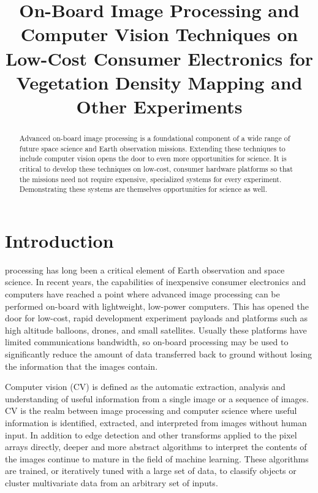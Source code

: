 \documentclass[conference]{IEEEtran} %
\title{On-Board Image Processing and Computer Vision Techniques on Low-Cost Consumer Electronics for Vegetation Density Mapping and Other Experiments}
\author{
   \IEEEauthorblockN{%
    Jeff~Maggio\IEEEauthorrefmark{1},
    Philip~Linden\IEEEauthorrefmark{2},
    T.J.~Tarazevits\IEEEauthorrefmark{3}
  }
  \IEEEauthorblockA{%
    RIT Space Exploration, Rochester Institute of Technology \\ %
    Rochester, N.Y. \\
    Email:
    \IEEEauthorrefmark{1}jxm9264.rit.edu,
    \IEEEauthorrefmark{2}pjl7651@rit.edu,
    \IEEEauthorrefmark{3}tjt3085@rit.edu
  }
}
\begin{document}
\maketitle%

\begin{abstract}
    Advanced on-board image processing is a foundational component of a wide range of future space science and Earth observation missions.
    Extending these techniques to include computer vision opens the door to even more opportunities for science.
    It is critical to develop these techniques on low-cost, consumer hardware platforms so that the missions need not require expensive, specialized systems for every experiment.
    Demonstrating these systems are themselves opportunities for science as well.
\end{abstract}

\section{Introduction}
\label{sec:introduction}

 processing has long been a critical element of Earth observation and space science.
In recent years, the capabilities of inexpensive consumer electronics and computers have reached a point where advanced image processing can be performed on-board with lightweight, low-power computers.
This has opened the door for low-cost, rapid development experiment payloads and platforms such as high altitude balloons, drones, and small satellites.
Usually these platforms have limited communications bandwidth, so on-board processing may be used to significantly reduce the amount of data transferred back to ground without losing the information that the images contain.

Computer vision (CV) is defined as the automatic extraction, analysis and understanding of useful information from a single image or a sequence of images.
CV is the realm between image processing and computer science where useful information is identified, extracted, and interpreted from images without human input.
In addition to edge detection and other transforms applied to the pixel arrays directly, deeper and more abstract algorithms to interpret the contents of the images continue to mature in the field of machine learning.
These algorithms are trained, or iteratively tuned with a large set of data, to classify objects or cluster multivariate data from an arbitrary set of inputs.
\end{document}
